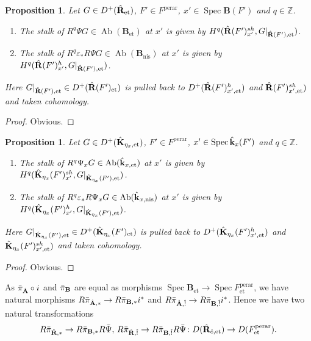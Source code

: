 \documentclass{amsart}
\newtheorem{Prop}[Thm]{Proposition}
\theoremstyle{remark}
\numberwithin{equation}{subsection}
\newcommand{\compose}{\mathbin{\circ}}
\newcommand{\Z}{\mathbb{Z}}
\newcommand{\et}{\mathrm{et}}
\newcommand{\perar}{\mathrm{perar}}
\newcommand{\alg}[1]{\mathbf{#1}}
\newcommand{\nis}{\mathrm{nis}}
\DeclareMathOperator{\Spec}{Spec}
\DeclareMathOperator{\Ab}{Ab}
\begin{document}
\begin{Prop} \label{0347}
	Let $G \in D^{+}(\Hat{\alg{R}}_{\et})$,
	$F' \in F^{\perar}$,
	$x' \in \Spec \alg{B}(F')$
	and $q \in \Z$.
	\begin{enumerate}
		\item
			The stalk of $R^{q} \Psi G \in \Ab(\alg{B}_{\et})$ at $x'$ is given by
			$H^{q}(\Hat{\alg{R}}(F')_{x'}^{sh}, G|_{\Hat{\alg{R}}(F'), \et})$.
		\item
			The stalk of $R^{q} \varepsilon_{\ast} R \Psi G \in \Ab(\alg{B}_{\nis})$ at $x'$ is given by
			$H^{q}(\Hat{\alg{R}}(F')_{x'}^{h}, G|_{\Hat{\alg{R}}(F'), \et})$.
	\end{enumerate}
	Here $G|_{\Hat{\alg{R}}(F'), \et} \in D^{+}(\Hat{\alg{R}}(F')_{\et})$ is
	pulled back to $D^{+}(\Hat{\alg{R}}(F')_{x', \et}^{h})$ and $\Hat{\alg{R}}(F')_{x', \et}^{sh})$
	and taken cohomology.
\end{Prop}

\begin{proof}
	Obvious.
\end{proof}

\begin{Prop} \label{0348}
	Let $G \in D^{+}(\Hat{\alg{K}}_{\eta_{x}, \et})$,
	$F' \in F^{\perar}$,
	$x' \in \Spec \Hat{\alg{k}}_{x}(F')$
	and $q \in \Z$.
	\begin{enumerate}
		\item
			The stalk of $R^{q} \Psi_{x} G \in \Ab(\Hat{\alg{k}}_{x, \et})$ at $x'$ is given by
			$H^{q}(\Hat{\alg{K}}_{\eta_{x}}(F')_{x'}^{sh}, G|_{\Hat{\alg{K}}_{\eta_{x}}(F'), \et})$.
		\item
			The stalk of $R^{q} \varepsilon_{\ast} R \Psi_{x} G \in \Ab(\Hat{\alg{k}}_{x, \nis})$ at $x'$ is given by
			$H^{q}(\Hat{\alg{K}}_{\eta_{x}}(F')_{x'}^{h}, G|_{\Hat{\alg{K}}_{\eta_{x}}(F'), \et})$.
	\end{enumerate}
	Here $G|_{\Hat{\alg{K}}_{\eta_{x}}(F'), \et} \in D^{+}(\Hat{\alg{K}}_{\eta_{x}}(F')_{\et})$ is
	pulled back to $D^{+}(\Hat{\alg{K}}_{\eta_{x}}(F')_{x', \et}^{h})$ and $\Hat{\alg{K}}_{\eta_{x}}(F')_{x', \et}^{sh})$
	and taken cohomology.
\end{Prop}

\begin{proof}
	Obvious.
\end{proof}

As $\Bar{\pi}_{\Hat{\alg{A}}} \compose i$ and $\Bar{\pi}_{\alg{B}}$
are equal as morphisms $\Spec \alg{B}_{\et} \to \Spec F^{\perar}_{\et}$,
we have natural morphisms
$R \Bar{\pi}_{\Hat{\alg{A}}, \ast} \to R \Bar{\pi}_{\alg{B}, \ast} i^{\ast}$
and $R \Bar{\pi}_{\Hat{\alg{A}}, \Hat{!}} \to R \Bar{\pi}_{\alg{B}, \Hat{!}} i^{\ast}$.
Hence we have two natural transformations
	\[
			R \Bar{\pi}_{\Hat{\alg{R}}, \ast} \to R \Bar{\pi}_{\alg{B}, \ast} R \Bar{\Psi},\,
			R \Bar{\pi}_{\Hat{\alg{R}}, \Hat{!}} \to R \Bar{\pi}_{\alg{B}, \Hat{!}} R \Bar{\Psi}
		\colon
			D(\Hat{\alg{R}}_{\Hat{c}, \et})
		\to
			D(F^{\perar}_{\et}).
	\]
\end{document}
